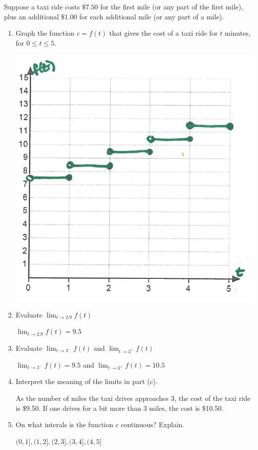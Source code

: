 \documentclass[nooutcomes]{ximera}
\begin{document}
\begin{problem}
Suppose a taxi ride costs $\$7.50$ for the first mile (or any part of the first mile), plus an additional $\$1.00$ for each additional mile (or any part of a mile).
\begin{enumerate}
	\item Graph the function $c=f(t)$ that gives the cost of a taxi ride for $t$ minutes, for $0 \le t \le 5$.
		\begin{freeResponse} \hfil
	\begin{image}
	\includegraphics[scale=.5]{Figure5.png}
	\end{image}
		\end{freeResponse}

	\item Evaluate $\lim_{t \to 2.9}f(t)$
		\begin{freeResponse}
$\lim_{t \to 2.9}f(t)=9.5$
		\end{freeResponse}
	\item Evaluate $\lim_{t \to 3^-}f(t)$ and $\lim_{t \to 3^+}f(t)$		
		\begin{freeResponse}
$\lim_{t \to 3^-}f(t)=9.5$ and $\lim_{t \to 3^+}f(t)=10.5$	
		\end{freeResponse}
	\item Interpret the meaning of the limits in part (c).
		\begin{freeResponse}
As the number of miles the taxi drives approaches 3, the cost of the taxi ride is \$9.50.  If one drives for a bit more than 3 miles, the cost is \$10.50.
		\end{freeResponse}
	\item On what interals is the function $c$ continuous?  Explain.
		\begin{freeResponse}
			$(0,1],(1,2],(2,3],(3,4],(4,5]$
		\end{freeResponse}
\end{enumerate}
\end{problem}
\end{document}
